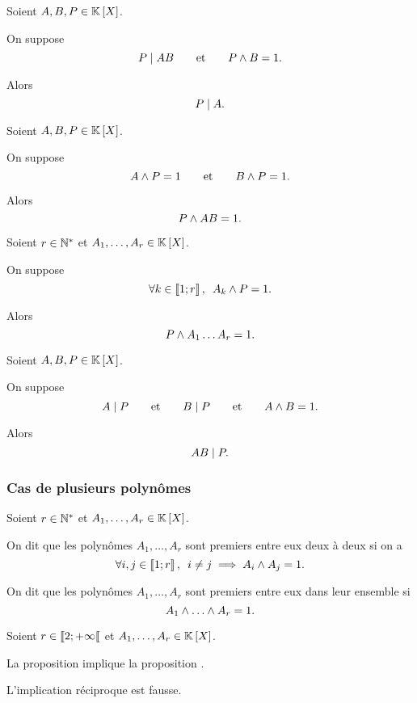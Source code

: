 \begin{lem}
Soient \(A,B,P\in\poly\).

On suppose \[P\mid AB\qquad\text{et}\qquad P\land B=1.\]

Alors \[P\mid A.\]
\end{lem}

\begin{prop}
Soient \(A,B,P\in\poly\).

On suppose \[A\land P=1\qquad\text{et}\qquad B\land P=1.\]

Alors \[P\land AB=1.\]
\end{prop}

\begin{cor}
Soient \(r\in\mathbb{N}^*\) et \(A_1,\dots,A_r\in\poly\).

On suppose \[\quantifs{\forall k\in\interventierii{1}{r}}A_k\et P=1.\]

Alors \[P\land A_1\dots A_r=1.\]
\end{cor}

\begin{prop}
Soient \(A,B,P\in\poly\).

On suppose \[A\mid P\qquad\text{et}\qquad B\mid P\qquad\text{et}\qquad A\land B=1.\]

Alors \[AB\mid P.\]
\end{prop}

\subsubsection{Cas de plusieurs polynômes}

\begin{defi}
Soient \(r\in\mathbb{N}^*\) et \(A_1,\dots,A_r\in\poly\).

On dit que les polynômes \(A_1,\dots,A_r\) sont premiers entre eux deux à deux si on a \[\quantifs{\forall i,j\in\interventierii{1}{r}}i\not=j\imp A_i\et A_j=1.\]

On dit que les polynômes \(A_1,\dots,A_r\) sont premiers entre eux dans leur ensemble si \[A_1\et\dots\et A_r=1.\]
\end{defi}

\begin{rem}
Soient \(r\in\left\llbracket2;+\infty\right\llbracket\) et \(A_1,\dots,A_r\in\poly\).

La proposition  implique la proposition .

L'implication réciproque est fausse.
\end{rem}

